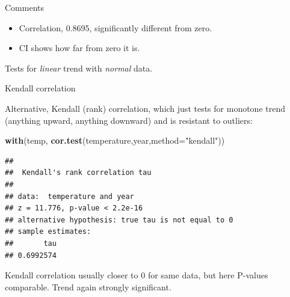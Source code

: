 \documentclass[ignorenonframetext,]{beamer}
\newenvironment{Shaded}{\begin{snugshade}}{\end{snugshade}}
\newcommand{\DataTypeTok}[1]{\textcolor[rgb]{0.13,0.29,0.53}{#1}}
\newcommand{\KeywordTok}[1]{\textcolor[rgb]{0.13,0.29,0.53}{\textbf{#1}}}
\newcommand{\NormalTok}[1]{#1}
\newcommand{\StringTok}[1]{\textcolor[rgb]{0.31,0.60,0.02}{#1}}
\providecommand{\tightlist}{%
  \setlength{\itemsep}{0pt}\setlength{\parskip}{0pt}}
\begin{document}
\begin{frame}{Comments}
\protect\hypertarget{comments}{}

\begin{itemize}
\tightlist
\item
  Correlation, 0.8695, significantly different from zero.
\item
  CI shows how far from zero it is.
\end{itemize}

Tests for \emph{linear} trend with \emph{normal} data.

\end{frame}

\begin{frame}[fragile]{Kendall correlation}
\protect\hypertarget{kendall-correlation}{}

Alternative, Kendall (rank) correlation, which just tests for monotone
trend (anything upward, anything downward) and is resistant to outliers:

\begin{Shaded}
\begin{Highlighting}[]
\KeywordTok{with}\NormalTok{(temp, }\KeywordTok{cor.test}\NormalTok{(temperature,year,}\DataTypeTok{method=}\StringTok{"kendall"}\NormalTok{))}
\end{Highlighting}
\end{Shaded}

\begin{verbatim}
## 
##  Kendall's rank correlation tau
## 
## data:  temperature and year
## z = 11.776, p-value < 2.2e-16
## alternative hypothesis: true tau is not equal to 0
## sample estimates:
##       tau 
## 0.6992574
\end{verbatim}

Kendall correlation usually closer to 0 for same data, but here P-values
comparable. Trend again strongly significant.

\end{frame}
\end{document}
